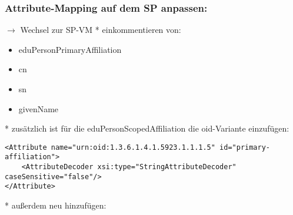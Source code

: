 \subsubsection*{Attribute-Mapping auf dem SP anpassen:}
$\rightarrow$ Wechsel zur SP-VM
* einkommentieren von:
\begin{itemize}
\item eduPersonPrimaryAffiliation
\item cn
\item sn
\item givenName
\end{itemize}
* zusätzlich ist für die eduPersonScopedAffiliation die oid-Variante einzufügen:
\begin{lstlisting}
<Attribute name="urn:oid:1.3.6.1.4.1.5923.1.1.1.5" id="primary-affiliation">
	<AttributeDecoder xsi:type="StringAttributeDecoder" caseSensitive="false"/>
</Attribute>
\end{lstlisting}
* außerdem neu hinzufügen:
